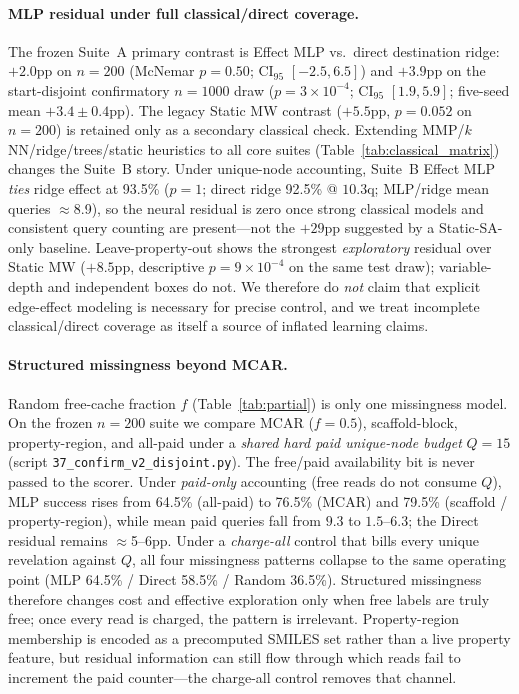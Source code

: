 \documentclass[journal=jcisd8,manuscript=article,email=false]{achemso}
\begin{document}
\paragraph{MLP residual under full classical/direct coverage.}
The frozen Suite~A primary contrast is Effect MLP vs.\ direct destination ridge: $+2.0$pp on $n{=}200$ (McNemar $p{=}0.50$; CI$_{95}$ $[-2.5,6.5]$) and $+3.9$pp on the start-disjoint confirmatory $n{=}1000$ draw ($p{=}3\times10^{-4}$; CI$_{95}$ $[1.9,5.9]$; five-seed mean $+3.4\pm0.4$pp). The legacy Static MW contrast ($+5.5$pp, $p{=}0.052$ on $n{=}200$) is retained only as a secondary classical check. Extending MMP/$k$NN/ridge/trees/static heuristics to all core suites (Table~\ref{tab:classical_matrix}) changes the Suite~B story. Under unique-node accounting, Suite~B Effect MLP \emph{ties} ridge effect at 93.5\% ($p{=}1$; direct ridge 92.5\% @ $10.3$q; MLP/ridge mean queries $\approx$8.9), so the neural residual is zero once strong classical models and consistent query counting are present---not the $+29$pp suggested by a Static-SA-only baseline. Leave-property-out shows the strongest \emph{exploratory} residual over Static MW ($+8.5$pp, descriptive $p{=}9\times10^{-4}$ on the same test draw); variable-depth and independent boxes do not. We therefore do \emph{not} claim that explicit edge-effect modeling is necessary for precise control, and we treat incomplete classical/direct coverage as itself a source of inflated learning claims.

\paragraph{Structured missingness beyond MCAR.}
Random free-cache fraction $f$ (Table~\ref{tab:partial}) is only one missingness model. On the frozen $n{=}200$ suite we compare MCAR ($f{=}0.5$), scaffold-block, property-region, and all-paid under a \emph{shared hard paid unique-node budget} $Q{=}15$ (script \texttt{37\_confirm\_v2\_disjoint.py}). The free/paid availability bit is never passed to the scorer. Under \emph{paid-only} accounting (free reads do not consume $Q$), MLP success rises from 64.5\% (all-paid) to 76.5\% (MCAR) and 79.5\% (scaffold / property-region), while mean paid queries fall from $9.3$ to $1.5$--$6.3$; the Direct residual remains $\approx$5--6pp. Under a \emph{charge-all} control that bills every unique revelation against $Q$, all four missingness patterns collapse to the same operating point (MLP 64.5\% / Direct 58.5\% / Random 36.5\%). Structured missingness therefore changes cost and effective exploration only when free labels are truly free; once every read is charged, the pattern is irrelevant. Property-region membership is encoded as a precomputed SMILES set rather than a live property feature, but residual information can still flow through which reads fail to increment the paid counter---the charge-all control removes that channel.
\end{document}
